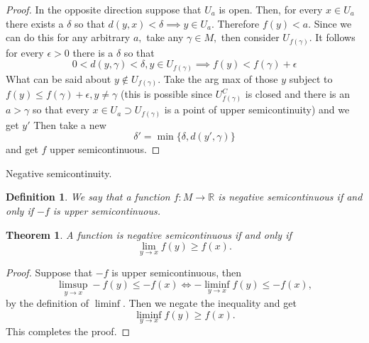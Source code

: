 \documentclass[letter]{article}
\newtheorem{theorem}{Theorem}
\newtheorem{definition}{Definition}
\newenvironment{menumerate}{%
  \edef\backupindent{\the\parindent}%
  \enumerate%
  \setlength{\parindent}{\backupindent}%
}{\endenumerate}
\begin{document}
\begin{menumerate}
\begin{menumerate}
\begin{proof}
         In the opposite direction suppose that $U_a$ is open.
         Then, for every $x \in U_a$ there exists a $\delta$ so that
         $d(y,x) < \delta \implies y \in U_a. $ Therefore $f(y) < a.$
         Since we can do this for any arbitrary $a,$ take any $\gamma \in M,$ then consider $U_{f(\gamma)}.$ It follows for every $\epsilon > 0$ there is a $\delta$ so that
         \begin{equation}
            0 < d(y, \gamma) < \delta, y \in U_{f(\gamma)} \implies f(y) < f(\gamma) + \epsilon
         \end{equation}
         What can be said about $y \notin U_{f(\gamma)}.$ Take the arg max of
         those $y$ subject to $f(y) \leq f(\gamma)  + \epsilon, y \neq \gamma$ (this is possible since $U_{f(\gamma)}^C$ is closed and there is an $a > \gamma$ so that every $x \in U_a \supset U_{f(\gamma)}$ is a point of upper semicontinuity) and we get $y'$ Then take a new 
         \begin{equation}
            \delta' = \min\{\delta, d(y',\gamma)\}
         \end{equation}
         and get $f$ upper semicontinuous.
    \end{proof}
    \item Negative semicontinuity.
    \begin{definition}
        We say that a function $f: M \to \mathbb{R}$ is negative semicontinuous if and only if $-f$ is upper semicontinuous.   
    \end{definition}
    \begin{theorem}
        A function is negative semicontinuous if and only if 
        \begin{equation}
            \lim_{y \to x} f(y) \geq f(x).    
        \end{equation}   
    \end{theorem}
    \begin{proof}
        Suppose that $-f$ is upper semicontinuous, then
        \begin{equation}
            \limsup_{y \to x} -f(y) \leq -f(x) \iff
            -\liminf_{y \to x} f(y) \leq -f(x),   
        \end{equation}   
        by the definition of $\liminf.$ Then we negate the inequality and get 
        \begin{equation}
            \liminf_{y\to x} f(y) \geq f(x).
        \end{equation}
        This completes the proof.
    \end{proof}

\end{menumerate}
\end{menumerate}
\end{document}
